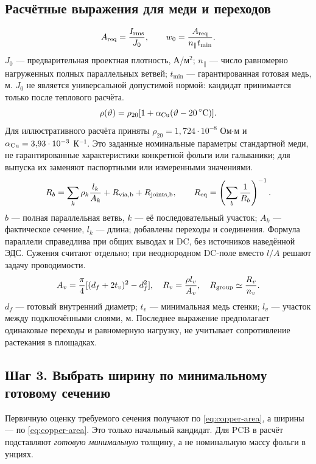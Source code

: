 \documentclass[14pt,a4paper]{extarticle}
\begin{document}
\subsection{Расчётные выражения для меди и переходов}
\begin{equation}
 A_{\rm req}=\frac{I_{\rm rms}}{J_0},\qquad
 w_0=\frac{A_{\rm req}}{n_\parallel t_{\min}}.
 \label{eq:copper-area}
\end{equation}
$J_0$ --- предварительная проектная плотность, А/м$^2$; $n_\parallel$ --- число равномерно нагруженных полных параллельных ветвей; $t_{\min}$ --- гарантированная готовая медь, м. $J_0$ не является универсальной допустимой нормой: кандидат принимается только после теплового расчёта.
\begin{equation}
 \rho(\vartheta)=\rho_{20}[1+\alpha_{\rm Cu}(\vartheta-20\,^{\circ}\mathrm C)].
 \label{eq:rho-temperature}
\end{equation}
Для иллюстративного расчёта приняты $\rho_{20}=1{,}724\cdot10^{-8}$ Ом$\cdot$м и $\alpha_{\rm Cu}=3{,}93\cdot10^{-3}$ К$^{-1}$. Это заданные номинальные параметры стандартной меди, не гарантированные характеристики конкретной фольги или гальваники; для выпуска их заменяют паспортными или измеренными значениями.
\begin{equation}
 R_b=\sum_k\rho_k\frac{l_k}{A_k}+R_{\rm via,b}+R_{\rm joints,b},
 \qquad R_{\rm eq}=\left(\sum_b\frac1{R_b}\right)^{-1}.
 \label{eq:planar-rdc}
\end{equation}
$b$ --- полная параллельная ветвь, $k$ --- её последовательный участок; $A_k$ --- фактическое сечение, $l_k$ --- длина; добавлены переходы и соединения. Формула параллели справедлива при общих выводах и DC, без источников наведённой ЭДС. Сужения считают отдельно; при неоднородном DC-поле вместо $l/A$ решают задачу проводимости.
\begin{equation}
 A_v=\frac\pi4[(d_f+2t_v)^2-d_f^2],\quad
 R_v=\frac{\rho l_v}{A_v},\quad R_{\rm group}\simeq\frac{R_v}{n_v}.
 \label{eq:via-resistance}
\end{equation}
$d_f$ --- готовый внутренний диаметр; $t_v$ --- минимальная медь стенки; $l_v$ --- участок между подключёнными слоями, м. Последнее выражение предполагает одинаковые переходы и равномерную нагрузку, не учитывает сопротивление растекания в площадках.

\subsection{Шаг 3. Выбрать ширину по минимальному готовому сечению}
Первичную оценку требуемого сечения получают по \eqref{eq:copper-area}, а ширины --- по \eqref{eq:copper-area}. Это только начальный кандидат. Для PCB в расчёт подставляют \emph{готовую минимальную} толщину, а не номинальную массу фольги в унциях.
\end{document}
